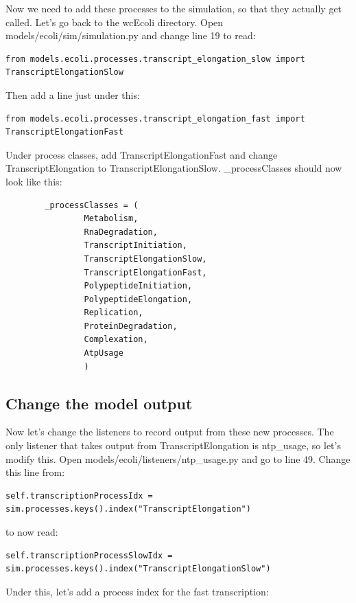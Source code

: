 \documentclass[12pt]{article}
\begin{document}
Now we need to add these processes to the simulation, so that they actually get called. Let’s go back to the wcEcoli directory. Open models/ecoli/sim/simulation.py and change line 19 to read: 

\lstset{language=Python}
\begin{lstlisting}
from models.ecoli.processes.transcript_elongation_slow import TranscriptElongationSlow
\end{lstlisting}

Then add a line just under this:

\begin{lstlisting}
from models.ecoli.processes.transcript_elongation_fast import TranscriptElongationFast
\end{lstlisting}

Under process classes, add TranscriptElongationFast and change TranscriptElongation to TranscriptElongationSlow. \_processClasses should now look like this:


\begin{lstlisting}
        _processClasses = (
                Metabolism,
                RnaDegradation,
                TranscriptInitiation,
                TranscriptElongationSlow,
                TranscriptElongationFast,
                PolypeptideInitiation,
                PolypeptideElongation,
                Replication,
                ProteinDegradation,
                Complexation,
                AtpUsage
                )
\end{lstlisting}

\subsection{Change the model output}

Now let’s change the listeners to record output from these new processes. The only listener that takes output from TranscriptElongation is ntp\_usage, so let’s modify this. Open models/ecoli/listeners/ntp\_usage.py and go to line 49. Change this line from:

\begin{lstlisting}
self.transcriptionProcessIdx = sim.processes.keys().index("TranscriptElongation")
\end{lstlisting}
to now read: 
\begin{lstlisting}
self.transcriptionProcessSlowIdx = sim.processes.keys().index("TranscriptElongationSlow")
\end{lstlisting}

Under this, let’s add a process index for the fast transcription:
\end{document}

